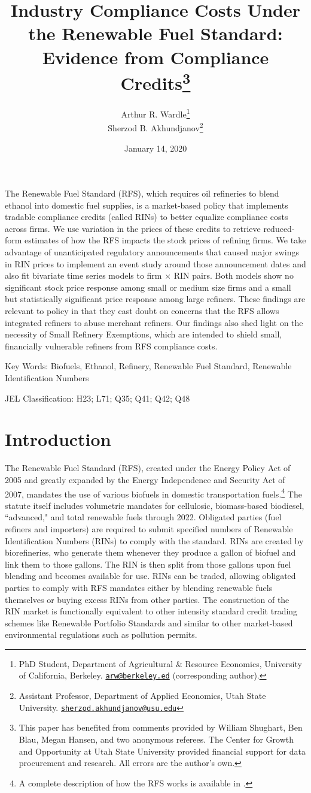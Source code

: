 \documentclass[11pt]{article}
\title{{\Large \bf Industry Compliance Costs Under the Renewable Fuel Standard: Evidence from Compliance Credits\thanks{This paper has benefited from comments provided by William Shughart, Ben Blau, Megan Hansen, and two anonymous referees. The Center for Growth and Opportunity at Utah State University provided financial support for data procurement and research. All errors are the author's own.}}}
\author{Arthur R. Wardle\footnote{
PhD Student, Department of Agricultural \& Resource Economics, University of California, Berkeley. \href{mailto:arw@berkeley.edu}{\tt arw@berkeley.ed} (corresponding author).}\\
Sherzod B. Akhundjanov\footnote{Assistant Professor, Department of Applied Economics, Utah State University. \href{matilto:sherzod.akhundjanov@usu.edu}{\tt sherzod.akhundjanov@usu.edu}}}
\date{January 14, 2020}
\begin{document}
\maketitle

The Renewable Fuel Standard (RFS), which requires oil refineries to blend ethanol into domestic fuel supplies, is a market-based policy that implements tradable compliance credits (called RINs) to better equalize compliance costs across firms. We use variation in the prices of these credits to retrieve reduced-form estimates of how the RFS impacts the stock prices of refining firms. We take advantage of unanticipated regulatory announcements that caused major swings in RIN prices to implement an event study around those announcement dates and also fit bivariate time series models to firm $\times$ RIN pairs. Both models show no significant stock price response among small or medium size firms and a small but statistically significant price response among large refiners. These findings are relevant to policy in that they cast doubt on concerns that the RFS allows integrated refiners to abuse merchant refiners. Our findings also shed light on the necessity of Small Refinery Exemptions, which are intended to shield small, financially vulnerable refiners from RFS compliance costs.
\newline

{\small
Key Words: Biofuels, Ethanol, Refinery, Renewable Fuel Standard, Renewable Identification Numbers

JEL Classification: H23; L71; Q35; Q41; Q42; Q48}
\newpage

\section{Introduction}

The Renewable Fuel Standard (RFS), created under the Energy Policy Act of 2005 and greatly expanded by the Energy Independence and Security Act of 2007, mandates the use of various biofuels in domestic transportation fuels.\footnote{A complete description of how the RFS works is available in \cite{Schnepf2013}.} The statute itself includes volumetric mandates for cellulosic, biomass-based biodiesel, ``advanced," and total renewable fuels through 2022. Obligated parties (fuel refiners and importers) are required to submit specified numbers of Renewable Identification Numbers (RINs) to comply with the standard. RINs are created by biorefineries, who generate them whenever they produce a gallon of biofuel and link them to those gallons. The RIN is then split from those gallons upon fuel blending and becomes available for use. RINs can be traded, allowing obligated parties to comply with RFS mandates either by blending renewable fuels themselves or buying excess RINs from other parties. The construction of the RIN market is functionally equivalent to other intensity standard credit trading schemes like Renewable Portfolio Standards and similar to other market-based environmental regulations such as pollution permits. 
\end{document}
